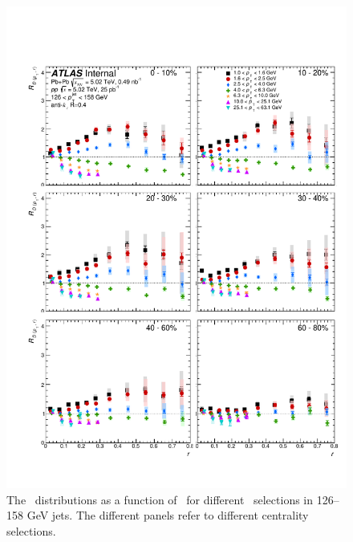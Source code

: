 \begin{figure}[h]
\includegraphics[width=1.0\textwidth]{figures/results/RDpT_dR_jet7}
\caption{The \RDptr\ distributions as a function of \rvar\ for different \pt\ selections in 126--158 GeV jets. The different panels refer to different centrality selections.}
\label{fig:fullset_rptr_j7}
\end{figure}

